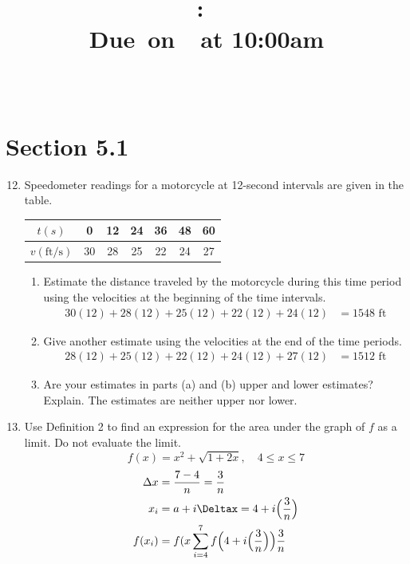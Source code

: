\documentclass{article}
\title{
    \vspace{2in}
    \textmd{\textbf{\hmwkClass:\ \hmwkTitle}}\\
    \normalsize\vspace{0.1in}\small{Due\ on\ \hmwkDueDate\ at 10:00am}\\
    \vspace{0.1in}\large{\textit{\hmwkClassInstructor\ \hmwkClassTime}}
    \vspace{3in}
}
\author{\hmwkAuthorName}
\date{}
\begin{document}
\maketitle

\pagebreak

\section{Section 5.1}
\begin{enumerate}
\setcounter{enumi}{11}
	\item Speedometer readings for a motorcycle at 12-second intervals are given in the table.
	\begin{center}
			\begin{tabular}{ | c | c | c | c | c | c | c | }
			  \hline     
			  $t(s)$ & 0 & 12 & 24 & 36 & 48 & 60 \\ \hline
			  $v(\text{ft/s})$ & 30 & 28 & 25 & 22 & 24 & 27 \\ \hline
			\end{tabular}
		\end{center}
	\begin{enumerate}
		\item Estimate the distance traveled by the motorcycle during this time period using the velocities at the beginning of the time intervals.
		$$\begin{align}
30(12)+28(12)+25(12)+22(12)+24(12)&=1548\text{ ft}
		\end{align}$$
		\item Give another estimate using the velocities at the end of the time periods.
		$$\begin{align}
28(12)+25(12)+22(12)+24(12)+27(12)&=1512\text{ ft}
		\end{align}$$
		\item Are your estimates in parts (a) and (b) upper and lower estimates? Explain.\newline
		The estimates are neither upper nor lower. 
	\end{enumerate}
\setcounter{enumi}{17}
	\item Use Definition 2 to find an expression for the area under the graph of $f$ as a limit. Do not evaluate the limit. $$f(x)=x^2 + \sqrt{1+2x}, \quad 4 \leq x \leq 7$$
	$$\begin{align}
		\Delta x &= \frac{7-4}{n}= \frac{3}{n}\\
		x_i&= a+i\Deltax=4+i\Big(\frac{3}{n}\Big)\\
		f(x_i)&=f(x
		\sum_{i=4}^{7} f\Big(4+i\Big(\frac{3}{n}\Big)\Big)\frac{3}{n}

\end{align}$$
\end{enumerate}
\end{document}
